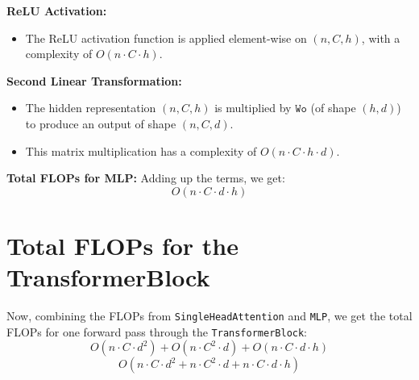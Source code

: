 \documentclass{article}
\begin{document}
\begin{tcolorbox}
\textbf{ReLU Activation:}
\begin{itemize}
    \item The ReLU activation function is applied element-wise on \((n, C, h)\), with a complexity of \(O(n \cdot C \cdot h)\).
\end{itemize}

\textbf{Second Linear Transformation:}
\begin{itemize}
    \item The hidden representation \((n, C, h)\) is multiplied by \(\texttt{Wo}\) (of shape \((h, d)\)) to produce an output of shape \((n, C, d)\).
    \item This matrix multiplication has a complexity of \(O(n \cdot C \cdot h \cdot d)\).
\end{itemize}

\textbf{Total FLOPs for MLP:}
Adding up the terms, we get:
\[
O(n \cdot C \cdot d \cdot h) 
\]

\section*{Total FLOPs for the TransformerBlock}

Now, combining the FLOPs from \texttt{SingleHeadAttention} and \texttt{MLP}, we get the total FLOPs for one forward pass through the \texttt{TransformerBlock}:
\[
O(n \cdot C \cdot d^2) + O(n \cdot C^2 \cdot d) + O(n \cdot C \cdot d \cdot h)
\]
\[
O(n \cdot C \cdot d^2 + n \cdot C^2 \cdot d + n \cdot C \cdot d \cdot h)
\]

\end{tcolorbox}
\end{document}
